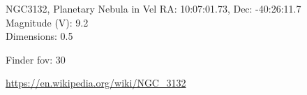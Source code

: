 \begin{block}{NGC3132, Planetary Nebula in Vel}
    RA: 10:07:01.73, Dec: -40:26:11.7 \\ 
    Magnitude (V): 9.2 \\ 
    Dimensions: 0.5 

    Finder fov: 30 

    \url{https://en.wikipedia.org/wiki/NGC_3132} 
\end{block}